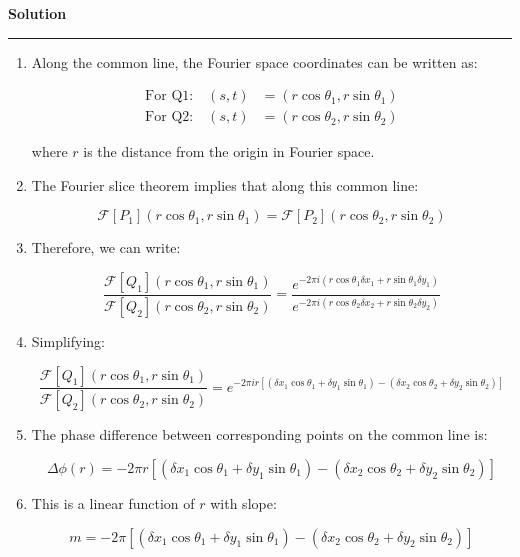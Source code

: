 \documentclass[a4paper,12pt]{article}
\newenvironment{solution}[2][]{%
    \begin{mdframed}[linecolor=blue!70!black, linewidth=2pt, roundcorner=10pt, backgroundcolor=yellow!10!white, skipabove=12pt, skipbelow=12pt]%
        \textbf{\large #2}
        \par\noindent\rule{\textwidth}{0.4pt}
}{
    \end{mdframed}
}
\begin{document}
\begin{solution}{Solution}
\begin{enumerate}
\item Along the common line, the Fourier space coordinates can be written as:

   \begin{align}
   \text{For Q1:} \quad (s,t) &= (r\cos\theta_1, r\sin\theta_1) \\
   \text{For Q2:} \quad (s,t) &= (r\cos\theta_2, r\sin\theta_2)
   \end{align}

   where $r$ is the distance from the origin in Fourier space.

\item The Fourier slice theorem implies that along this common line:

   \begin{equation}
   \mathcal{F}[P_1](r\cos\theta_1, r\sin\theta_1) = \mathcal{F}[P_2](r\cos\theta_2, r\sin\theta_2)
   \end{equation}

\item Therefore, we can write:

   \begin{equation}
   \frac{\mathcal{F}[Q_1](r\cos\theta_1, r\sin\theta_1)}{\mathcal{F}[Q_2](r\cos\theta_2, r\sin\theta_2)} = \frac{e^{-2\pi i(r\cos\theta_1\delta x_1 + r\sin\theta_1\delta y_1)}}{e^{-2\pi i(r\cos\theta_2\delta x_2 + r\sin\theta_2\delta y_2)}}
   \end{equation}

\item Simplifying:

   \begin{equation}
   \frac{\mathcal{F}[Q_1](r\cos\theta_1, r\sin\theta_1)}{\mathcal{F}[Q_2](r\cos\theta_2, r\sin\theta_2)} = e^{-2\pi i r[(\delta x_1\cos\theta_1 + \delta y_1\sin\theta_1) - (\delta x_2\cos\theta_2 + \delta y_2\sin\theta_2)]}
   \end{equation}

\item The phase difference between corresponding points on the common line is:

   \begin{equation}
   \Delta\phi(r) = -2\pi r[(\delta x_1\cos\theta_1 + \delta y_1\sin\theta_1) - (\delta x_2\cos\theta_2 + \delta y_2\sin\theta_2)]
   \end{equation}

\item This is a linear function of $r$ with slope:

   \begin{equation}
   m = -2\pi[(\delta x_1\cos\theta_1 + \delta y_1\sin\theta_1) - (\delta x_2\cos\theta_2 + \delta y_2\sin\theta_2)]
   \end{equation}


\end{enumerate}
\end{solution}
\end{document}
